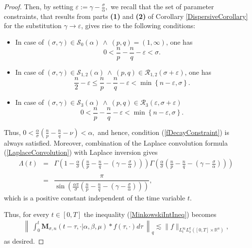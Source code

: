 \documentclass{amsart}
\theoremstyle{definition}
\theoremstyle{remark}
\numberwithin{equation}{section}
\newcommand{\BR}{{\mathbb R}}
\begin{document}
\begin{proof}
			Then, by setting $\displaystyle \varepsilon:=\gamma-\frac{\sigma}{\alpha},$
			we recall that the set of parameter constraints, that results from parts {\bf (1)} and {\bf (2)} of Corollary \ref{DispersiveCorollary} for the substitution $\gamma\rightarrow \varepsilon$, gives rise to the following conditions:
			\begin{itemize}
				\item[\bf (i)] In case of $(\sigma,\gamma)\in \mathcal{S}_0\left(\alpha\right)~\wedge~(p,q)=(1,\infty)$, one has
				$$0<\frac{n}{p}-\frac{n}{q}-\varepsilon<\sigma.$$
				\item[\bf (ii)] In case of $(\sigma,\gamma)\in \mathcal{S}_{1,2}\left(\alpha\right)~\wedge~(p,q)\in \mathcal{R}_{1,2}\left(\sigma+\varepsilon\right)$, one has
				$$
				\frac{n}{2}-\varepsilon\leq \frac{n}{p}-\frac{n}{q}-\varepsilon<\min\left\{n-\varepsilon,\sigma\right\}.
				$$
				\item[\bf (iii)] In case of $(\sigma,\gamma)\in \mathcal{S}_{3}\left(\alpha\right)~\wedge~(p,q)\in \mathcal{R}_{3}\left(\varepsilon,\sigma+\varepsilon\right)$
				$$	0<\frac{n}{p}-\frac{n}{q}-\varepsilon<\min\left\{n-\varepsilon,\sigma\right\}. $$
			\end{itemize}
			
			Thus,
			$
			\displaystyle 0<\frac{\alpha}{\sigma}\left(\frac{n}{p}-\frac{n}{q}-\nu\right)<\alpha,
			$
			and hence, condition (\ref{fDecayConstraint}) is always satisfied. 
			Moreover, combination of the Laplace convolution formula (\ref{LaplaceConvolution}) with Laplace inversion gives
			\begin{eqnarray*}
				\Lambda(t)&=&\Gamma\left(1-\frac{\alpha}{\sigma}\left(\frac{n}{p}-\frac{n}{q}-\left(\gamma-\frac{\sigma}{\alpha}\right)\right)\right)\Gamma\left(\frac{\alpha}{\sigma}\left(\frac{n}{p}-\frac{n}{q}-\left(\gamma-\frac{\sigma}{\alpha}\right)\right)\right) \\ \ \\
				&=&\dfrac{\pi}{\sin\left(\frac{\alpha \pi}{\sigma}\left(\frac{n}{p}-\frac{n}{q}-\left(\gamma-\frac{\sigma}{\alpha}\right)\right) \right)},
			\end{eqnarray*}
			which is a positive constant independent of the time variable $t$. 
			
			Thus, for every $t\in [0,T]$ the inequality (\ref{MinkowskiIntIneq}) becomes
			\begin{eqnarray*}
				\left\|~\displaystyle \int_0^t {\bm M}_{\sigma,n}(t-\tau,\cdot|\alpha,\beta,\mu)\ast  f(\tau,\cdot)d\tau~\right \|_q \lesssim \|f\|_{L^\infty_tL^q_x([0,T]\times\BR^n)},
			\end{eqnarray*} as desired.
		\end{proof}
		
\end{document}
